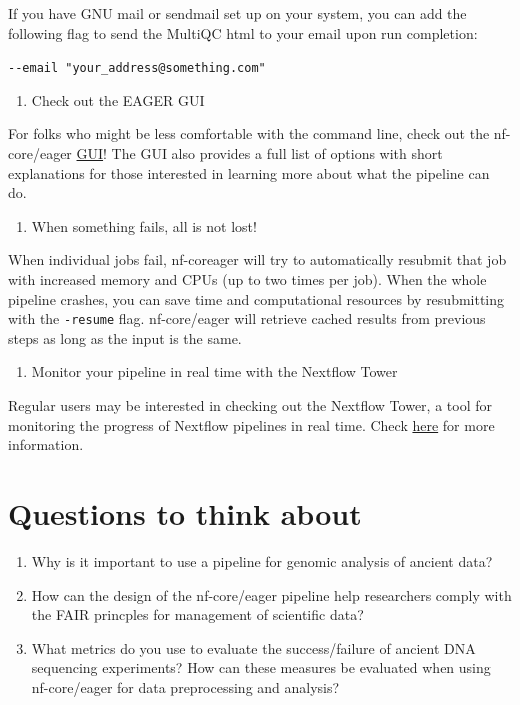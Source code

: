 \documentclass[
  letterpaper,
]{book}
\providecommand{\tightlist}{%
  \setlength{\itemsep}{0pt}\setlength{\parskip}{0pt}}\usepackage{longtable,booktabs,array}
\begin{document}
If you have GNU mail or sendmail set up on your system, you can add the
following flag to send the MultiQC html to your email upon run
completion:

\texttt{-\/-email\ "your\_address@something.com"}

\begin{enumerate}
\def\labelenumi{\arabic{enumi}.}
\setcounter{enumi}{3}
\tightlist
\item
  Check out the EAGER GUI
\end{enumerate}

For folks who might be less comfortable with the command line, check out
the nf-core/eager
\href{https://nf-co.re/launch?id=1664901787_8f819102c461}{GUI}! The GUI
also provides a full list of options with short explanations for those
interested in learning more about what the pipeline can do.

\begin{enumerate}
\def\labelenumi{\arabic{enumi}.}
\setcounter{enumi}{4}
\tightlist
\item
  When something fails, all is not lost!
\end{enumerate}

When individual jobs fail, nf-coreager will try to automatically
resubmit that job with increased memory and CPUs (up to two times per
job). When the whole pipeline crashes, you can save time and
computational resources by resubmitting with the \texttt{-resume} flag.
nf-core/eager will retrieve cached results from previous steps as long
as the input is the same.

\begin{enumerate}
\def\labelenumi{\arabic{enumi}.}
\setcounter{enumi}{5}
\tightlist
\item
  Monitor your pipeline in real time with the Nextflow Tower
\end{enumerate}

Regular users may be interested in checking out the Nextflow Tower, a
tool for monitoring the progress of Nextflow pipelines in real time.
Check \href{https://help.tower.nf/22.2/}{here} for more information.

\hypertarget{questions-to-think-about-5}{%
\section{Questions to think about}\label{questions-to-think-about-5}}

\begin{enumerate}
\def\labelenumi{\arabic{enumi}.}
\tightlist
\item
  Why is it important to use a pipeline for genomic analysis of ancient
  data?
\item
  How can the design of the nf-core/eager pipeline help researchers
  comply with the FAIR princples for management of scientific data?
\item
  What metrics do you use to evaluate the success/failure of ancient DNA
  sequencing experiments? How can these measures be evaluated when using
  nf-core/eager for data preprocessing and analysis?
\end{enumerate}
\end{document}
